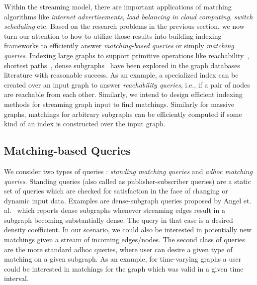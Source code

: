\documentclass{scrartcl}
\begin{document}
Within the streaming model, there are important applications of matching algorithms like \emph{internet advertisements}, \emph{load balancing in cloud computing}, \emph{switch scheduling} etc. Based on the research problems in the previous section, we now turn our attention to how to utilize those results into building indexing frameworks to efficiently answer \emph{matching-based queries} or simply \emph{matching queries}. Indexing large graphs to support primitive operations like reachability~\cite{seufert2013ferrari}, shortest paths~\cite{Gubichev:2010}, dense subgraphs~\cite{angel_dense_2013} have been explored in the graph databases literature with reasonable success.  As an example, a specialized index can be created over an input graph to answer \emph{reachability queries}, i.e., if a pair of nodes are reachable from each other. Similarly, we intend to design efficient indexing methods for streaming graph input to find matchings. Similarly for massive graphs, matchings for arbitrary subgraphs can be efficiently computed if some kind of an index is constructed over the input graph.

\subsection{Matching-based Queries} 
We consider two types of queries : \emph{standing matching queries} and \emph{adhoc matching queries}. Standing queries (also called as publisher-subscriber queries) are a static set of queries which are checked for satisfaction in the face of changing or dynamic input data. Examples are dense-subgraph queries proposed by Angel et. al.~\cite{angel_dense_2013} which reports dense subgraphs whenever streaming edges result in a subgraph becoming substantially dense. The query in that case is a desired density coefficient. In our scenario, we could also be interested in potentially new matchings given a stream of incoming edges/nodes. The second class of queries are the more standard adhoc queries, where user can desire a given type of matching on a given subgraph. As an example, for time-varying graphs a user could be interested in matchings for the graph which was valid in a given time interval.
\end{document}
